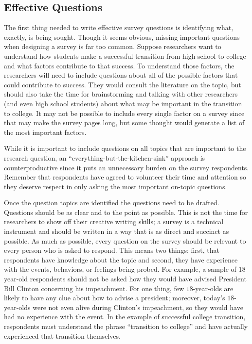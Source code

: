 \subsection{Effective Questions}

The first thing needed to write effective survey questions is identifying what, exactly, is being sought. Though it seems obvious, missing important questions when designing a survey is far too common. Suppose researchers want to understand how students make a successful transition from high school to college and what factors contribute to that success. To understand those factors, the researchers will need to include questions about all of the possible factors that could contribute to success. They would consult the literature on the topic, but should also take the time for brainstorming and talking with other researchers (and even high school students) about what may be important in the transition to college. It may not be possible to include every single factor on a survey since that may make the survey pages long, but some thought would generate a list of the most important factors.

While it is important to include questions on all topics that are important to the research question, an ``everything-but-the-kitchen-sink'' approach is counterproductive since it puts an unnecessary burden on the survey respondents. Remember that respondents have agreed to volunteer their time and attention so they deserve respect in only asking the most important on-topic questions.

Once the question topics are identified the questions need to be drafted. Questions should be as clear and to the point as possible. This is not the time for researchers to show off their creative writing skills; a survey is a technical instrument and should be written in a way that is as direct and succinct as possible. As much as possible, every question on the survey should be relevant to every person who is asked to respond. This means two things: first, that respondents have knowledge about the topic and second, they have experience with the events, behaviors, or feelings being probed. For example, a sample of $ 18 $-year-old respondents should not be asked how they would have advised President Bill Clinton concerning his impeachment. For one thing, few $ 18 $-year-olds are likely to have any clue about how to advise a president; moreover, today's $ 18 $-year-olds were not even alive during Clinton's impeachment, so they would have had no experience with the event. In the example of successful college transition, respondents must understand the phrase ``transition to college'' and have actually experienced that transition themselves.

